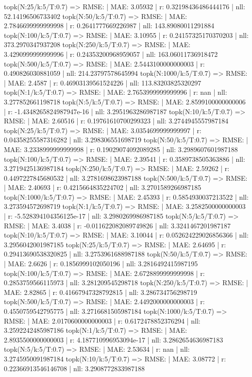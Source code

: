 topk(N:25/k:5/T:0.7) => RMSE: | MAE: 3.05932 | r: 0.32198436486444176 | nll: 52.14196506733402
topk(N:50/k:5/T:0.7) => RMSE: | MAE: 2.7846699999999998 | r: 0.2641777669226987 | nll: 143.89080011291884
topk(N:100/k:5/T:0.7) => RMSE: | MAE: 3.10955 | r: 0.24157325170370203 | nll: 373.2970347937208
topk(N:250/k:5/T:0.7) => RMSE: | MAE: 3.4290999999999996 | r: 0.24353200968959057 | nll: 163.06011736918472
topk(N:500/k:5/T:0.7) => RMSE: | MAE: 2.5443100000000003 | r: 0.490826030881059 | nll: 214.23797578645994
topk(N:1000/k:5/T:0.7) => RMSE: | MAE: 2.4587 | r: 0.46903139561524226 | nll: 113.83203825320297
topk(N:1/k:5/T:0.7) => RMSE: | MAE: 2.7653999999999996 | r: nan | nll: 3.277852661198718
topk(N:5/k:5/T:0.7) => RMSE: | MAE: 2.8599100000000006 | r: -1.4348265824987947e-16 | nll: 3.2951963286987187
topk(N:10/k:5/T:0.7) => RMSE: | MAE: 2.60516 | r: 0.19761610700299323 | nll: 3.2744945557987184
topk(N:25/k:5/T:0.7) => RMSE: | MAE: 3.0354699999999997 | r: 0.04358255587316282 | nll: 3.298306551698719
topk(N:50/k:5/T:0.7) => RMSE: | MAE: 3.2338999999999998 | r: 0.19029074092089285 | nll: 3.2989607601987188
topk(N:100/k:5/T:0.7) => RMSE: | MAE: 2.39541 | r: 0.3589738505363886 | nll: 3.2719425136987184
topk(N:250/k:5/T:0.7) => RMSE: | MAE: 2.59262 | r: 0.4497227845680532 | nll: 3.2781698623987188
topk(N:500/k:5/T:0.7) => RMSE: | MAE: 2.40693 | r: 0.4215664835224702 | nll: 3.2701589266987185
topk(N:1000/k:5/T:0.7) => RMSE: | MAE: 2.45393 | r: 0.5854930037213522 | nll: 3.273594572698719
topk(N:1/k:5/T:0.7) => RMSE: | MAE: 3.2582500000000003 | r: -5.528394104356125e-17 | nll: 3.2980269986987185
topk(N:5/k:5/T:0.7) => RMSE: | MAE: 3.4038 | r: -0.011622082089749826 | nll: 3.3241467201987187
topk(N:10/k:5/T:0.7) => RMSE: | MAE: 3.10044 | r: 0.052624229026856366 | nll: 3.2956042001987185
topk(N:25/k:5/T:0.7) => RMSE: | MAE: 2.64695 | r: 0.29413690538320825 | nll: 3.2753961688987188
topk(N:50/k:5/T:0.7) => RMSE: | MAE: 2.6626 | r: 0.1856999102050196 | nll: 3.2816492415987195
topk(N:100/k:5/T:0.7) => RMSE: | MAE: 2.6728899999999998 | r: 0.2853759566115973 | nll: 3.281209545298718
topk(N:250/k:5/T:0.7) => RMSE: | MAE: 2.82865 | r: 0.41667947328792815 | nll: 3.286734756298719
topk(N:500/k:5/T:0.7) => RMSE: | MAE: 2.4492000000000003 | r: 0.4550759542795775 | nll: 3.2716681505987184
topk(N:1000/k:5/T:0.7) => RMSE: | MAE: 2.0170600000000003 | r: 0.6172478852376294 | nll: 3.2592242485987186
topk(N:1/k:5/T:0.7) => RMSE: | MAE: 2.8935500000000003 | r: 4.187710996953094e-17 | nll: 3.2862654636987183
topk(N:5/k:5/T:0.7) => RMSE: | MAE: 2.53634 | r: nan | nll: 3.2745950091987184
topk(N:10/k:5/T:0.7) => RMSE: | MAE: 3.08772 | r: 0.22366913546146708 | nll: 3.2908772833987188
